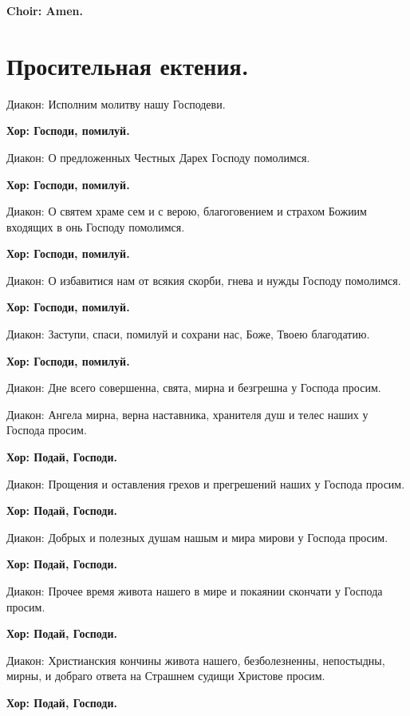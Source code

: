 \documentclass[12pt,a4paper,titlepage]{report}
\begin{document}
\begin{paracol}[1]{2}
  \textbf{Choir: Amen.}

  \switchcolumn[1]

  \section*{Просительная ектения.}

  Диакон: Исполним молитву нашу Господеви.

  \textbf{Хор: Господи, помилуй.}

  Диакон: О предложенных Честных Дарех Господу помолимся.

  \textbf{Хор: Господи, помилуй.}

  Диакон: О святем храме сем и с верою, благоговением и страхом Божиим входящих в онь Господу помолимся.

  \textbf{Хор: Господи, помилуй.}

  Диакон: О избавитися нам от всякия скорби, гнева и нужды Господу помолимся.

  \textbf{Хор: Господи, помилуй.}

  Диакон: Заступи, спаси, помилуй и сохрани нас, Боже, Твоею благодатию.

  \textbf{Хор: Господи, помилуй.}

  Диакон: Дне всего совершенна, свята, мирна и безгрешна у Господа просим.


  Диакон: Ангела мирна, верна наставника, хранителя душ и телес наших у Господа просим.

  \textbf{Хор: Подай, Господи.}

  Диакон: Прощения и оставления грехов и прегрешений наших у Господа просим.

  \textbf{Хор: Подай, Господи.}

  Диакон: Добрых и полезных душам нашым и мира мирови у Господа просим.

  \textbf{Хор: Подай, Господи.}

  Диакон: Прочее время живота нашего в мире и покаянии скончати у Господа просим.

  \textbf{Хор: Подай, Господи.}

  Диакон: Христианския кончины живота нашего, безболезненны, непостыдны, мирны, и добраго ответа на Страшнем судищи Христове просим.

  \textbf{Хор: Подай, Господи.}


\end{paracol}
\end{document}
